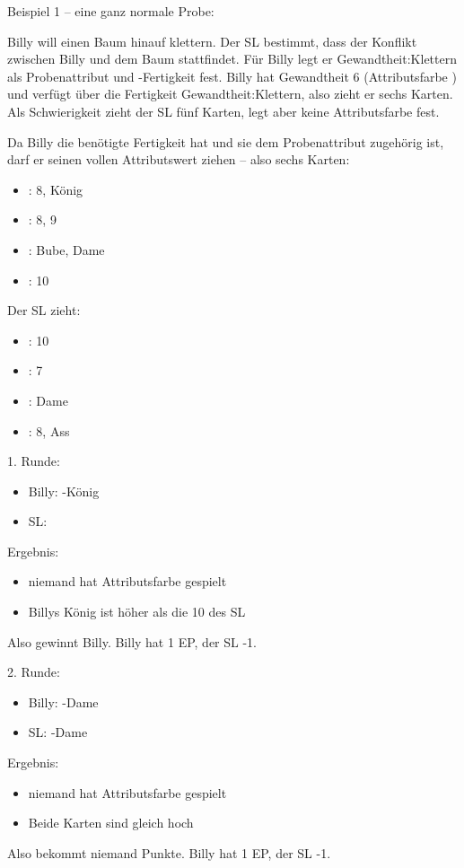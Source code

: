 Beispiel 1 -- eine ganz normale Probe:

Billy will einen Baum hinauf klettern. Der SL bestimmt, dass der Konflikt zwischen Billy und dem Baum stattfindet. Für Billy legt er Gewandtheit:Klettern als Probenattribut und -Fertigkeit fest. Billy hat Gewandtheit 6 (Attributsfarbe \kreuz) und verfügt über die Fertigkeit Gewandtheit:Klettern, also zieht er sechs Karten. Als Schwierigkeit zieht der SL fünf Karten, legt aber keine Attributsfarbe fest.

Da Billy die benötigte Fertigkeit hat und sie dem Probenattribut zugehörig ist, darf er seinen vollen Attributswert ziehen -- also sechs Karten:
\begin {itemize}
\item \herz: 8, König
\item \karo: 8, 9
\item \pik: Bube, Dame
\item \kreuz: 10
\end {itemize}

Der SL zieht:
\begin {itemize}
\item \herz: 10
\item \karo: 7
\item \pik: Dame
\item \kreuz: 8, Ass
\end {itemize}

1. Runde:
\begin {itemize}
\item Billy: \herz-König
\item SL: 
\end {itemize}

Ergebnis:
\begin {itemize}
\item niemand hat Attributsfarbe gespielt
\item Billys König ist höher als die 10 des SL
\end {itemize}
Also gewinnt Billy. Billy hat 1 EP, der SL -1.

2. Runde:
\begin {itemize}
\item Billy: \pik-Dame
\item SL: \pik-Dame
\end {itemize}

Ergebnis:
\begin {itemize}
\item niemand hat Attributsfarbe gespielt
\item Beide Karten sind gleich hoch
\end {itemize}
Also bekommt niemand Punkte. Billy hat 1 EP, der SL -1.

